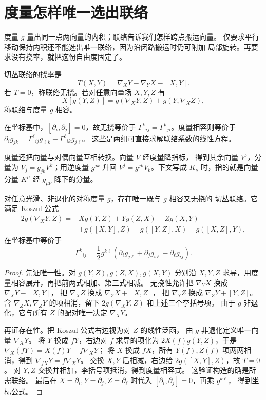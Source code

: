 \section{度量怎样唯一选出联络}
\label{sec:math-levi-civita-proof}

度量 \(g\) 量出同一点两向量的内积；联络告诉我们怎样跨点搬运向量。
仅要求平行移动保持内积还不能选出唯一联络，因为沿闭路搬运时仍可附加
局部旋转。再要求没有挠率，就把这份自由度固定了。

\begin{definition}[挠率与度量相容]
切丛联络的挠率是
\[
T(X,Y)=\nabla_XY-\nabla_YX-[X,Y].
\]
若 \(T=0\)，称联络无挠。若对任意向量场 \(X,Y,Z\) 有
\[
X[g(Y,Z)]
=g(\nabla_XY,Z)+g(Y,\nabla_XZ),
\]
称联络与度量 \(g\) 相容。
\end{definition}

在坐标基中，\([\partial_i,\partial_j]=0\)，故无挠等价于
\(\Gamma^k{}_{ij}=\Gamma^k{}_{ji}\)。度量相容则等价于
\(\partial_i g_{jk}
=\Gamma^\ell{}_{ij}g_{\ell k}
+\Gamma^\ell{}_{ik}g_{j\ell}\)。
这些是两组可直接求解联络系数的线性方程。

度量还把向量与对偶向量互相转换。向量 \(V\) 经度量降指标，
得到其余向量 \(V^\flat\)，分量为
\(V_j=g_{jk}V^k\)；用逆度量 \(g^{jk}\) 升回
\(V^j=g^{jk}V_k\)。下文写成 \(K_\nu\) 时，指的就是向量
分量 \(K^\mu\) 经 \(g_{\mu\nu}\) 降下的分量。

\begin{theorem}
对任意光滑、非退化的对称度量 \(g\)，存在唯一既与 \(g\) 相容又无挠的
切丛联络。它满足 Koszul 公式
\begin{align*}
2g(\nabla_XY,Z)
={}&Xg(Y,Z)+Yg(Z,X)-Zg(X,Y)\\
&+g([X,Y],Z)-g([Y,Z],X)-g([X,Z],Y),
\end{align*}
在坐标基中等价于
\begin{equation}
\Gamma^k{}_{ij}
=\frac12g^{k\ell}
(\partial_i g_{j\ell}+\partial_j g_{i\ell}
-\partial_\ell g_{ij}).
\label{eq:math-levi-civita-coefficients}
\end{equation}
\end{theorem}
\begin{proof}
先证唯一性。对 \(g(Y,Z),g(Z,X),g(X,Y)\) 分别沿
\(X,Y,Z\) 求导，用度量相容展开，再把前两式相加、第三式相减。
无挠性允许把 \(\nabla_YX\) 换成 \(\nabla_XY-[X,Y]\)，
把 \(\nabla_XZ\) 换成 \(\nabla_ZX+[X,Z]\)，
把 \(\nabla_YZ\) 换成 \(\nabla_ZY+[Y,Z]\)。
含 \(\nabla_ZX,\nabla_ZY\) 的项相消，留下
\(2g(\nabla_XY,Z)\) 和上述三个李括号项。
由于 \(g\) 非退化，它与所有 \(Z\) 的配对唯一决定 \(\nabla_XY\)。



再证存在性。把 Koszul 公式右边视为对 \(Z\) 的线性泛函，
由 \(g\) 非退化定义唯一向量 \(\nabla_XY\)。
将 \(Y\) 换成 \(fY\)，右边对 \(f\) 求导的项化为
\(2X(f)g(Y,Z)\)，于是
\(\nabla_X(fY)=X(f)Y+f\nabla_XY\)；
将 \(X\) 换成 \(fX\)，所有 \(Y(f),Z(f)\) 项两两相消，得到
\(\nabla_{fX}Y=f\nabla_XY\)。
交换 \(X,Y\) 后相减，右边给
\(2g([X,Y],Z)\)，故 \(T=0\)。
对 \(Y,Z\) 交换并相加，李括号项抵消，得到度量相容式。
这验证构造的确是所需联络。
最后在 \(X=\partial_i,Y=\partial_j,Z=\partial_\ell\)
时代入 \([\partial_i,\partial_j]=0\)，再乘 \(g^{k\ell}\)，
得到坐标公式。
\end{proof}

